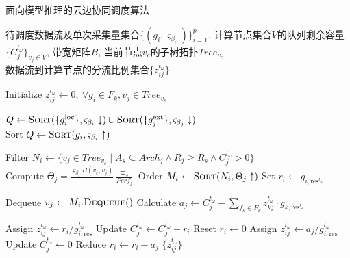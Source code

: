 \begin{breakablealgorithm}
\caption{面向模型推理的云边协同调度算法}
\label{alg:cluster_scheduling}
\begin{algorithmic}[1]
\REQUIRE  
  待调度数据流及单次采集量集合$\{(g_i, \varsigma_{\beta_i})\}_{i=1}^p$, 
  计算节点集合$V$的队列剩余容量$\{C^{t_\omega}_j\}_{v_j \in V}$, 带宽矩阵$B$, 当前节点$v_c$的子树拓扑$Tree_{v_c}$ \\ 
\ENSURE  
  数据流到计算节点的分流比例集合$\{z_{ij}^{t_\omega}\}$
  
\STATE Initialize $z_{ij}^{t_\omega} \leftarrow 0,\ \forall g_i \in F_k, v_j \in Tree_{v_c}$  

\STATE $Q \leftarrow \textsc{Sort}(\{g_i^{\text{loc}}\}, \varsigma_{\beta_i} \downarrow) \cup \textsc{Sort}(\{g_j^{\text{ext}}\}, \varsigma_{\beta_j} \downarrow)$
  \\ 
\STATE Sort $Q \leftarrow \textsc{Sort}( g_i, \varsigma_{\beta_i} \uparrow)$ 
\ENDIF

  \STATE Filter $N_i \leftarrow \{v_j \in Tree_{v_c} \mid A_s \subseteq Arch_j \wedge R_j \geq R_s \wedge C^{t_\omega}_j > 0\}$  
    \\ 
  \STATE Compute $\Theta_j = \frac{\varsigma_{\beta_i}{B}(v_c,v_j)} + \frac{\varpi_s}{Perf_j}$
  \STATE Order $M_i \leftarrow \textsc{Sort}(N_i, \Theta_j \uparrow)$  
  \STATE Set $r_i \leftarrow g_{i,\text{res}^{t_\omega}}$

    \STATE Dequeue $v_j \leftarrow M_i.\textsc{Dequeue}()$
    \STATE Calculate $a_j \leftarrow C^{t_\omega}_j - \sum_{f_k \in F_k} z_{kj}^{t_\omega} \cdot g_{k,\text{res}^{t_\omega}}$
    
      \STATE Assign $z_{ij}^{t_\omega} \leftarrow r_i / g_{i,\text{res}}^{t_\omega}$  
      \STATE Update $C^{t_\omega}_j \leftarrow C^{t_\omega}_j - r_i$
      \STATE Reset $r_i \leftarrow 0$
    \ELSE
      \STATE Assign $z_{ij}^{t_\omega} \leftarrow a_j / g_{i,\text{res}}^{t_\omega}$  
      \STATE Update $C^{t_\omega}_j \leftarrow 0$
      \STATE Reduce $r_i \leftarrow r_i - a_j$
    \ENDIF
  \ENDWHILE
\ENDFOR
\RETURN $\{z_{ij}^{t_\omega}\}$
\end{algorithmic}
\end{breakablealgorithm}


